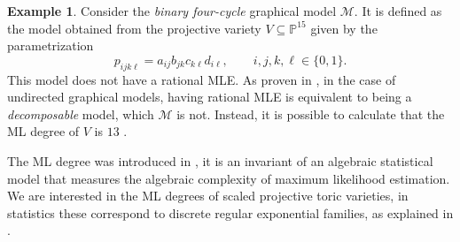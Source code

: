 \documentclass[12pt,reqno]{amsart}   	%
\theoremstyle{plain}
\theoremstyle{definition}
\newtheorem{example}[theorem]{Example}
\theoremstyle{remark}
\newcommand{\LL}{\mathcal{L}}
\begin{document}
\begin{example}
Consider the \textit{binary four-cycle} graphical model $\mathcal{M}$. It is defined as the model obtained from the projective variety $V \subseteq \mathbb{P}^{15}$ given by the parametrization
\[
p_{ijk\ell} = a_{ij} b_{jk}c_{k\ell}d_{i\ell}, \qquad i, j, k, \ell \in \{0,1\}.
\]
This model does not have a rational MLE. As proven in \cite[Theorem~4.4]{geiger2006}, in the case of undirected graphical models, having rational MLE is equivalent to being a \textit{decomposable} model, which $\mathcal{M}$ is not. Instead, it is possible to calculate that the ML degree of $V$ is $13$ \cite[p.~1484]{geiger2006}.
\end{example}

The ML degree was introduced in \cite{catanese2006,hosten2005}, it is an invariant of an algebraic statistical model that measures the algebraic complexity of maximum likelihood estimation. 
We are interested in the ML degrees of scaled projective toric varieties, in statistics these correspond to discrete regular exponential families, as explained in \cite[Section 6.2]{sullivant2019}. 
\end{document}
